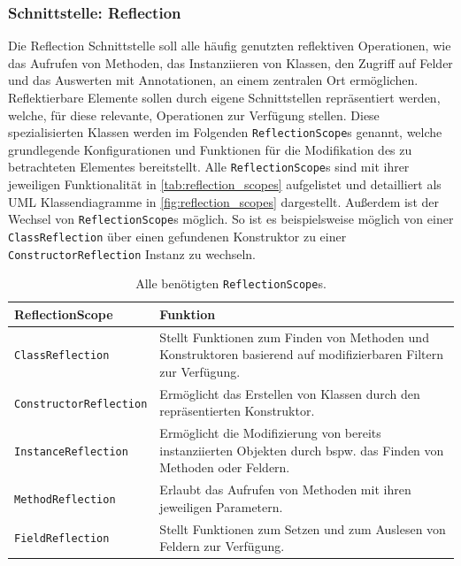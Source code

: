 \subsubsection{Schnittstelle: Reflection}
Die Reflection Schnittstelle soll alle häufig genutzten reflektiven Operationen, wie das Aufrufen von Methoden, das Instanziieren von Klassen, den Zugriff auf Felder und das Auswerten mit Annotationen, an einem zentralen Ort ermöglichen. Reflektierbare Elemente sollen durch eigene Schnittstellen repräsentiert werden, welche, für diese relevante, Operationen zur Verfügung stellen. Diese spezialisierten Klassen werden im Folgenden \texttt{ReflectionScope}s genannt, welche grundlegende Konfigurationen und Funktionen für die Modifikation des zu betrachteten Elementes bereitstellt. Alle \texttt{ReflectionScope}s sind mit ihrer jeweiligen Funktionalität in \autoref{tab:reflection_scopes} aufgelistet und detailliert als UML Klassendiagramme in \autoref{fig:reflection_scopes} dargestellt. Außerdem ist der Wechsel von \texttt{ReflectionScope}s möglich. So ist es beispielsweise möglich von einer \texttt{ClassReflection} über einen gefundenen Konstruktor zu einer \texttt{ConstructorReflection} Instanz zu wechseln.
\begin{table}[H]
	\centering
	\renewcommand*{\arraystretch}{1.3}
	\begin{tabular}{|p{}|p{}|}
		\hline
		ReflectionScope & Funktion\\
		\hline
		\texttt{ClassReflection} & Stellt Funktionen zum Finden von Methoden und Konstruktoren basierend auf modifizierbaren Filtern zur Verfügung.\\
		\hline
		\texttt{ConstructorReflection} & Ermöglicht das Erstellen von Klassen durch den repräsentierten Konstruktor.\\
		\hline
		\texttt{InstanceReflection} & Ermöglicht die Modifizierung von bereits instanziierten Objekten durch bspw. das Finden von Methoden oder Feldern.\\
		\hline
		\texttt{MethodReflection} & Erlaubt das Aufrufen von Methoden mit ihren jeweiligen Parametern.\\
		\hline
		\texttt{FieldReflection} & Stellt Funktionen zum Setzen und zum Auslesen von Feldern zur Verfügung.\\
		\hline
	\end{tabular}
	\caption{Alle benötigten \texttt{ReflectionScope}s.}
	\label{tab:reflection_scopes}
\end{table}
